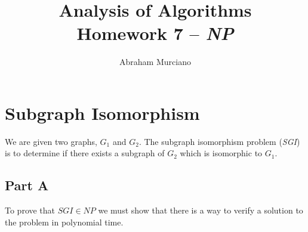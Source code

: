 \documentclass{article}
\title{Analysis of Algorithms \\
\medskip
\large Homework 7 -- \textit{NP}}
\author{Abraham Murciano}
\begin{document}
\maketitle

\section{Subgraph Isomorphism}

We are given two graphs, \(G_1\) and \(G_2\). The subgraph isomorphism problem (\textit{SGI}) is to determine if there exists a subgraph of \(G_2\) which is isomorphic to \(G_1\).

\subsection*{Part A}

To prove that \(\mathit{SGI} \in \mathit{NP}\) we must show that there is a way to verify a solution to the problem in polynomial time.
\end{document}

